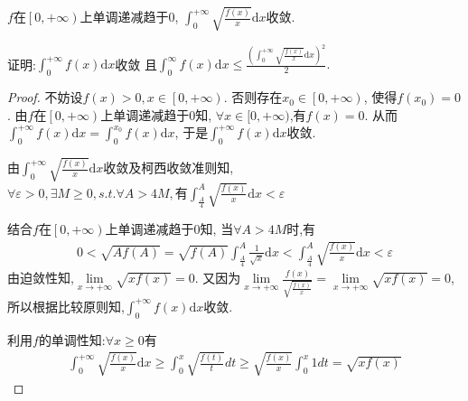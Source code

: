 \documentclass[lang=cn,newtx,10pt,scheme=chinese]{../Template/elegantbook}
\begin{document}
\begin{example}
$f$在$\left[ 0,+\infty \right) $上单调递减趋于0,
$\int_0^{+\infty}{\sqrt{\frac{f(x)}{x}}\mathrm{d}x}$收敛.

证明:$\int_0^{+\infty}{f\left( x \right) \mathrm{d}x}$收敛
且$\int_0^{\infty}{f\left( x \right) \mathrm{d}x}\leqslant \frac{\left( \int_0^{+\infty}{\sqrt{\frac{f\left( x \right)}{x}}\mathrm{d}x} \right) ^2}{2}.$
\begin{proof}
不妨设$f(x)>0,x\in \left[ 0,+\infty \right)$.
否则存在$x_0\in \left[ 0,+\infty \right)$,
使得$f\left( x_0 \right) =0$.
由$f$在$\left[ 0,+\infty \right) $上单调递减趋于0知,
$ \forall x\in [0,+\infty)$,有$f(x)=0$.
从而$\int_0^{+\infty}{f\left( x \right) \mathrm{d}x}=\int_0^{x_0}{f\left( x \right) \mathrm{d}x}$,
于是$\int_0^{+\infty}{f\left( x \right) \mathrm{d}x}$收敛.

由$\int_0^{+\infty}{\sqrt{\frac{f(x)}{x}}\mathrm{d}x}$收敛及柯西收敛准则知,
$\forall \varepsilon>0,\exists M\geqslant 0,s.t. \forall A>4M,\text{有}
\int_{\frac{A}{4}}^A{\sqrt{\frac{f(x)}{x}}\mathrm{d}x}<\varepsilon$

结合$f$在$\left[ 0,+\infty \right) $上单调递减趋于0知,
当$\forall A>4M$时,有
\begin{equation}
\begin{split}
0<\sqrt{Af(A)}=\sqrt{f(A)}\int_{\frac{A}{4}}^A{\frac{1}{\sqrt{x}}\mathrm{d}x<}\int_{\frac{A}{4}}^A{\sqrt{\frac{f(x)}{x}}\mathrm{d}x<}\varepsilon 
\end{split}
\nonumber
\end{equation}
由迫敛性知,$\underset{x\rightarrow +\infty}{\lim}\sqrt{xf(x)}=0$.
又因为$\underset{x\rightarrow +\infty}{\lim}\frac{f(x)}{\sqrt{\frac{f(x)}{x}}}=\underset{x\rightarrow +\infty}{\lim}\sqrt{xf(x)}=0$,
所以根据比较原则知,$\int_0^{+\infty}{f\left( x \right) \mathrm{d}x}$收敛.

利用$f$的单调性知:$\forall x \geqslant 0$有
\begin{equation}
\begin{split}
\int_0^{+\infty}{\sqrt{\frac{f(x)}{x}}\mathrm{d}x}\geqslant \int_0^x{\sqrt{\frac{f(t)}{t}}dt}\geqslant \sqrt{\frac{f(x)}{x}}\int_0^x{1dt}=\sqrt{xf\left( x \right)}
\end{split}
\nonumber
\end{equation}


\end{proof}
\end{example}
\end{document}

